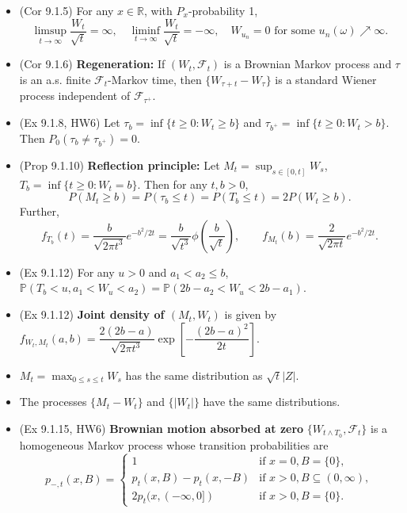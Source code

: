 \documentclass[twoside]{article}
\newcommand{\dis}{\displaystyle}
\newcommand\bbP{\mathbb{P}}
\newcommand\bbR{\mathbb{R}}
\newcommand\calF{\mathcal{F}}
\newcommand\om{\omega}
\newcommand\goesto{\rightarrow}
\begin{document}
\begin{itemize}
\item (Cor 9.1.5) For any $x \in \bbR$, with $P_x$-probability 1,
\[ \limsup_{t \goesto \infty} \frac{W_t}{\sqrt{t}} = \infty, \quad \liminf_{t \goesto \infty} \frac{W_t}{\sqrt{t}} = -\infty, \quad W_{u_n} = 0 \text{ for some } u_n(\om) \nearrow \infty. \]

\item (Cor 9.1.6) \textbf{Regeneration:} If $(W_t, \calF_t)$ is a Brownian Markov process and $\tau$ is an a.s. finite $\calF_t$-Markov time, then $\{ W_{\tau + t} - W_\tau \}$ is a standard Wiener process independent of $\calF_{\tau^+}$.

\item (Ex 9.1.8, HW6) Let $\tau_b = \inf \{ t \geq 0: W_t \geq b\}$ and $\tau_{b^+} = \inf \{ t \geq 0: W_t > b\}$. Then $P_0(\tau_b \neq \tau_{b^+}) = 0$.

\item (Prop 9.1.10) \textbf{Reflection principle:} Let $M_t = \dis\sup_{s \in [0,t]} W_s$, $T_b = \inf \{ t \geq 0: W_t = b\}$. Then for any $t, b > 0$,
\[ P(M_t \geq b) = P(\tau_b \leq t) = P(T_b \leq t) = 2P(W_t \geq b). \]
Further,
\[ f_{T_b}(t) = \frac{b}{\sqrt{2\pi t^3}} e^{-b^2/2t} = \frac{b}{\sqrt{t^3}} \phi \left(\frac{b}{\sqrt{t}}\right), \qquad f_{M_t}(b) = \frac{2}{\sqrt{2\pi t}}e^{-b^2/2t}. \]

\item (Ex 9.1.12) For any $u > 0$ and $a_1 < a_2 \leq b$, $\bbP(T_b < u, a_1 < W_u < a_2) = \bbP(2b - a_2 < W_u < 2b-a_1)$.

\item (Ex 9.1.12) \textbf{Joint density of $(M_t, W_t)$} is given by $f_{W_t, M_t}(a,b) = \dfrac{2(2b-a)}{\sqrt{2\pi t^3}} \exp \left[ -\dfrac{(2b-a)^2}{2t} \right]$.

\item $M_t = \dis\max_{0 \leq s \leq t} W_s$ has the same distribution as $\sqrt{t}|Z|$.

\item The processes $\{ M_t - W_t\}$ and $\{ |W_t| \}$ have the same distributions.

\item (Ex 9.1.15, HW6) \textbf{Brownian motion absorbed at zero} $\{ W_{t \wedge T_0}, \calF_t\}$ is a homogeneous Markov process whose transition probabilities are
\[ p_{-,t}(x, B) = \begin{cases} 1 &\text{if } x = 0, B = \{0\}, \\ p_t(x, B) - p_t(x, -B) &\text{if } x > 0, B \subseteq (0, \infty), \\ 2p_t(x, (-\infty, 0]) &\text{if } x > 0, B = \{0 \}.  \end{cases} \]


\end{itemize}
\end{document}
